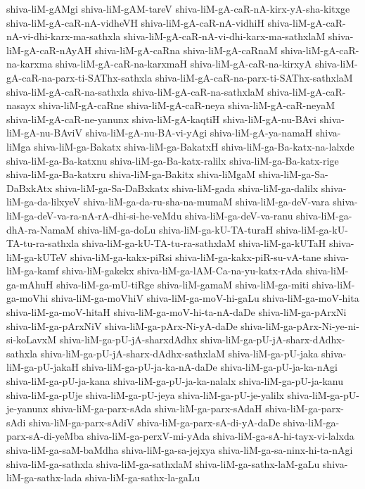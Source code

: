 {shiva-liM-gAMgi
shiva-liM-gAM-tareV
shiva-liM-gA-caR-nA-kirx-yA-sha-kitxge
shiva-liM-gA-caR-nA-vidheVH
shiva-liM-gA-caR-nA-vidhiH
shiva-liM-gA-caR-nA-vi-dhi-karx-ma-sathxla
shiva-liM-gA-caR-nA-vi-dhi-karx-ma-sathxlaM
shiva-liM-gA-caR-nAyAH
shiva-liM-gA-caRna
shiva-liM-gA-caRnaM
shiva-liM-gA-caR-na-karxma
shiva-liM-gA-caR-na-karxmaH
shiva-liM-gA-caR-na-kirxyA
shiva-liM-gA-caR-na-parx-ti-SAThx-sathxla
shiva-liM-gA-caR-na-parx-ti-SAThx-sathxlaM
shiva-liM-gA-caR-na-sathxla
shiva-liM-gA-caR-na-sathxlaM
shiva-liM-gA-caR-nasayx
shiva-liM-gA-caRne
shiva-liM-gA-caR-neya
shiva-liM-gA-caR-neyaM
shiva-liM-gA-caR-ne-yanunx
shiva-liM-gA-kaqtiH
shiva-liM-gA-nu-BAvi
shiva-liM-gA-nu-BAviV
shiva-liM-gA-nu-BA-vi-yAgi
shiva-liM-gA-ya-namaH
shiva-liMga
shiva-liM-ga-Bakatx
shiva-liM-ga-BakatxH
shiva-liM-ga-Ba-katx-na-lalxde
shiva-liM-ga-Ba-katxnu
shiva-liM-ga-Ba-katx-ralilx
shiva-liM-ga-Ba-katx-rige
shiva-liM-ga-Ba-katxru
shiva-liM-ga-Bakitx
shiva-liMgaM
shiva-liM-ga-Sa-DaBxkAtx
shiva-liM-ga-Sa-DaBxkatx
shiva-liM-gada
shiva-liM-ga-dalilx
shiva-liM-ga-da-lilxyeV
shiva-liM-ga-da-ru-sha-na-mumaM
shiva-liM-ga-deV-vara
shiva-liM-ga-deV-va-ra-nA-rA-dhi-si-he-veMdu
shiva-liM-ga-deV-va-ranu
shiva-liM-ga-dhA-ra-NamaM
shiva-liM-ga-doLu
shiva-liM-ga-kU-TA-turaH
shiva-liM-ga-kU-TA-tu-ra-sathxla
shiva-liM-ga-kU-TA-tu-ra-sathxlaM
shiva-liM-ga-kUTaH
shiva-liM-ga-kUTeV
shiva-liM-ga-kakx-piRsi
shiva-liM-ga-kakx-piR-su-vA-tane
shiva-liM-ga-kamf
shiva-liM-gakekx
shiva-liM-ga-lAM-Ca-na-yu-katx-rAda
shiva-liM-ga-mAhuH
shiva-liM-ga-mU-tiRge
shiva-liM-gamaM
shiva-liM-ga-miti
shiva-liM-ga-moVhi
shiva-liM-ga-moVhiV
shiva-liM-ga-moV-hi-gaLu
shiva-liM-ga-moV-hita
shiva-liM-ga-moV-hitaH
shiva-liM-ga-moV-hi-ta-nA-daDe
shiva-liM-ga-pArxNi
shiva-liM-ga-pArxNiV
shiva-liM-ga-pArx-Ni-yA-daDe
shiva-liM-ga-pArx-Ni-ye-ni-si-koLavxM
shiva-liM-ga-pU-jA-sharxdAdhx
shiva-liM-ga-pU-jA-sharx-dAdhx-sathxla
shiva-liM-ga-pU-jA-sharx-dAdhx-sathxlaM
shiva-liM-ga-pU-jaka
shiva-liM-ga-pU-jakaH
shiva-liM-ga-pU-ja-ka-nA-daDe
shiva-liM-ga-pU-ja-ka-nAgi
shiva-liM-ga-pU-ja-kana
shiva-liM-ga-pU-ja-ka-nalalx
shiva-liM-ga-pU-ja-kanu
shiva-liM-ga-pUje
shiva-liM-ga-pU-jeya
shiva-liM-ga-pU-je-yalilx
shiva-liM-ga-pU-je-yanunx
shiva-liM-ga-parx-sAda
shiva-liM-ga-parx-sAdaH
shiva-liM-ga-parx-sAdi
shiva-liM-ga-parx-sAdiV
shiva-liM-ga-parx-sA-di-yA-daDe
shiva-liM-ga-parx-sA-di-yeMba
shiva-liM-ga-perxV-mi-yAda
shiva-liM-ga-sA-hi-tayx-vi-lalxda
shiva-liM-ga-saM-baMdha
shiva-liM-ga-sa-jejxya
shiva-liM-ga-sa-ninx-hi-ta-nAgi
shiva-liM-ga-sathxla
shiva-liM-ga-sathxlaM
shiva-liM-ga-sathx-laM-gaLu
shiva-liM-ga-sathx-lada
shiva-liM-ga-sathx-la-gaLu
}
